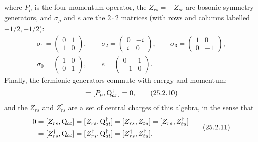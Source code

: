 where \(P_\mu\) is the four-momentum operator, the
\(Z_{rs}=-Z_{sr}\) are bosonic symmetry generators, and \(\sigma_\mu\)
and \(e\) are the \(2\cdot2\) matrices (with rows and columns labelled
\(+1/2,-1/2\)):
\begin{equation}
\begin{gathered}
\sigma_1=
\begin{pmatrix}0&1\\1&0\end{pmatrix},
\qquad
\sigma_2=
\begin{pmatrix}0&-i\\i&0\end{pmatrix},
\qquad
\sigma_3=
\begin{pmatrix}1&0\\0&-1\end{pmatrix},
\\
\sigma_0=
\begin{pmatrix}1&0\\0&1\end{pmatrix},
\qquad
e=
\begin{pmatrix}0&1\\-1&0\end{pmatrix}.
\end{gathered}
\tag{25.2.9}\label{eq:25.2.9}
\end{equation}
Finally, the fermionic generators commute with energy and momentum:
\begin{equation}
[P_\mu,\WeylQ_{ar}]=[P_\mu,\WeylQ_{ar}^\dagger]=0,
\tag{25.2.10}\label{eq:25.2.10}
\end{equation}
and the \(Z_{rs}\) and \(Z_{rs}^\dagger\) are a set of central charges of this
algebra, in the sense that
\begin{equation}
\begin{aligned}
0
&=[Z_{rs},\mathrm{Q}_{at}]
=[Z_{rs},\mathrm{Q}_{at}^\dagger]
=[Z_{rs},Z_{tu}]
=[Z_{rs},Z_{tu}^\dagger]
\\
&=[Z_{rs}^\dagger,\mathrm{Q}_{at}]
=[Z_{rs}^\dagger,\mathrm{Q}_{at}^\dagger]
=[Z_{rs}^\dagger,Z_{tu}^\dagger].
\end{aligned}
\tag{25.2.11}\label{eq:25.2.11}
\end{equation}


